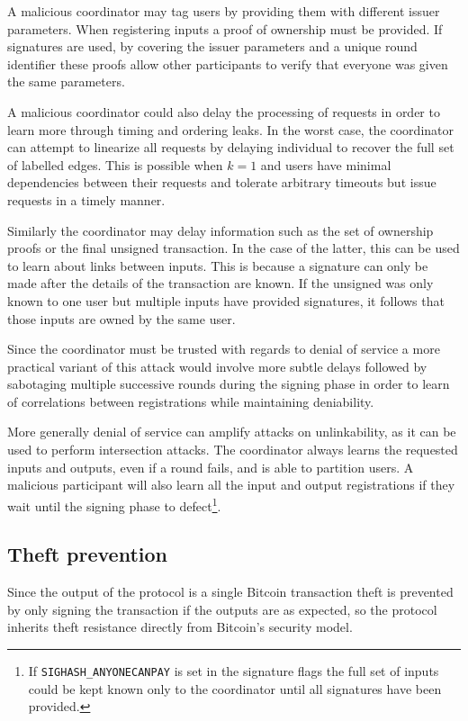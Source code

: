\documentclass[a4paper]{article}
\begin{document}
A malicious coordinator may tag users by providing them with different issuer parameters. When registering inputs a proof of ownership must be provided. If signatures are used, by covering the issuer parameters and a unique round identifier these proofs allow other participants to verify that everyone was given the same parameters.

A malicious coordinator could also delay the processing of requests in order to learn more through timing and ordering leaks. In the worst case, the coordinator can attempt to linearize all requests by delaying individual to recover the full set of labelled edges. This is possible when $k=1$ and users have minimal dependencies between their requests and tolerate arbitrary timeouts but issue requests in a timely manner.

Similarly the coordinator may delay information such as the set of ownership proofs or the final unsigned transaction. In the case of the latter, this can be used to learn about links between inputs. This is because a signature can only be made after the details of the transaction are known. If the unsigned was only known to one user but multiple inputs have provided signatures, it follows that those inputs are owned by the same user.

Since the coordinator must be trusted with regards to denial of service a more practical variant of this attack would involve more subtle delays followed by sabotaging multiple successive rounds during the signing phase in order to learn of correlations between registrations while maintaining deniability.

More generally denial of service can amplify attacks on unlinkability, as it can be used to perform intersection attacks. The coordinator always learns the requested inputs and outputs, even if a round fails, and is able to partition users. A malicious participant will also learn all the input and output registrations if they wait until the signing phase to defect\footnote{If \texttt{SIGHASH\_ANYONECANPAY} is set in the signature flags the full set of inputs could be kept known only to the coordinator until all signatures have been provided.}.

\subsection{Theft prevention}

Since the output of the protocol is a single Bitcoin transaction theft is prevented by only signing the transaction if the outputs are as expected, so the protocol inherits theft resistance directly from Bitcoin's security model.
\end{document}
